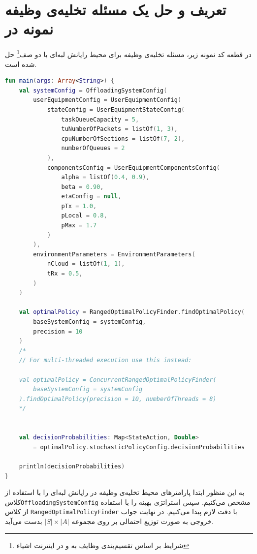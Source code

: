\section{تعریف و حل یک مسئله تخلیه‌ی وظیفه نمونه در }
در قطعه کد نمونه زیر، مسئله تخلیه‌ی وظیفه‌ برای محیط رایانش لبه‌ای با دو صف\footnote{شرایط بر اساس تقسیم‌بندی وظایف به  و  در اینترنت اشیاء} حل شده است.
\begin{LTR}
	\begin{lstlisting}[language=Kotlin, caption={تعریف و حل مسئله نمونه}, captiondirection=RTL, label={lst:solve}]
fun main(args: Array<String>) {
	val systemConfig = OffloadingSystemConfig(
		userEquipmentConfig = UserEquipmentConfig(
			stateConfig = UserEquipmentStateConfig(
				taskQueueCapacity = 5,
				tuNumberOfPackets = listOf(1, 3),
				cpuNumberOfSections = listOf(7, 2),
				numberOfQueues = 2
			),
			componentsConfig = UserEquipmentComponentsConfig(
				alpha = listOf(0.4, 0.9),
				beta = 0.90,
				etaConfig = null,
				pTx = 1.0,
				pLocal = 0.8,
				pMax = 1.7
			)
		),
		environmentParameters = EnvironmentParameters(
			nCloud = listOf(1, 1),
			tRx = 0.5,
		)
	)
	
	val optimalPolicy = RangedOptimalPolicyFinder.findOptimalPolicy(
		baseSystemConfig = systemConfig, 
		precision = 10
	)
	/*
	// For multi-threaded execution use this instead:
	
	val optimalPolicy = ConcurrentRangedOptimalPolicyFinder(
		baseSystemConfig = systemConfig
	).findOptimalPolicy(precision = 10, numberOfThreads = 8)
	*/
	
	
	val decisionProbabilities: Map<StateAction, Double>
		= optimalPolicy.stochasticPolicyConfig.decisionProbabilities
	
	println(decisionProbabilities)
}
	\end{lstlisting}
\end{LTR}
به این منظور ابتدا پارامترهای محیط تخلیه‌ی وظیفه در رایانش لبه‌ای را با استفاده از کلاس\linebreak \texttt{\footnotesize OffloadingSystemConfig} مشخص می‌کنیم. سپس استراتژی بهینه را با استفاده از کلاس \texttt{\footnotesize RangedOptimalPolicyFinder} با دقت لازم پیدا می‌کنیم. در نهایت جواب خروجی به صورت توزیع احتمالی بر روی مجموعه $|S| \times |A|$ بدست می‌آید.
\newpage
